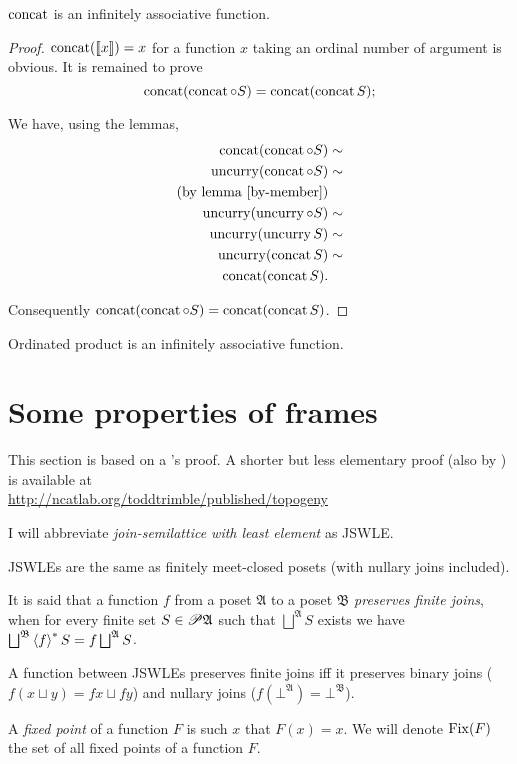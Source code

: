 \begin{thm}
$\operatorname{concat}$ is an infinitely associative function.\end{thm}
\begin{proof}
$\operatorname{concat}(\llbracket x\rrbracket)=x$ for a function $x$ taking an
ordinal number of argument is obvious. It is remained to prove
\[
\operatorname{concat}(\operatorname{concat}\circ S)=\operatorname{concat}(\operatorname{concat} S);
\]


We have, using the lemmas,
\begin{align*}
\operatorname{concat}(\operatorname{concat}\circ S) & \sim\\
\operatorname{uncurry}(\operatorname{concat}\circ S) & \sim\\
\text{(by lemma \ref{by-member})}\\
\operatorname{uncurry}(\operatorname{uncurry}\circ S) & \sim\\
\operatorname{uncurry}(\operatorname{uncurry} S) & \sim\\
\operatorname{uncurry}(\operatorname{concat} S) & \sim\\
\operatorname{concat}(\operatorname{concat} S).
\end{align*}


Consequently $\operatorname{concat}(\operatorname{concat}\circ S)=\operatorname{concat}(\operatorname{concat} S)$.\end{proof}
\begin{cor}
Ordinated product is an infinitely associative function.
\end{cor}

\section{Some properties of frames}\label{some-frames}

This section is based on a 's proof. A shorter
but less elementary proof (also by ) is available
at\\
\href{http://ncatlab.org/toddtrimble/published/topogeny}{http://ncatlab.org/toddtrimble/published/topogeny}

I will abbreviate \emph{join-semilattice with least element} as JSWLE.
\begin{obvious}
JSWLEs are the same as finitely meet-closed posets (with nullary joins
included).
\end{obvious}

\begin{defn}
It is said that a function $f$ from a poset $\mathfrak{A}$ to a
poset $\mathfrak{B}$ \emph{preserves finite joins}, when for every
finite set $S\in\mathscr{P}\mathfrak{A}$ such that $\bigsqcup^{\mathfrak{A}}S$
exists we have $\bigsqcup^{\mathfrak{B}}\left\langle f\right\rangle^{\ast}S=f\bigsqcup^{\mathfrak{A}}S$.\end{defn}
\begin{obvious}
A function between JSWLEs preserves finite joins iff it preserves
binary joins ($f(x\sqcup y)=fx\sqcup fy$) and nullary joins ($f(\bot^{\mathfrak{A}})=\bot^{\mathfrak{B}}$).\end{obvious}
\begin{defn}
A \emph{fixed point} of a function $F$ is such $x$ that $F(x)=x$.
We will denote $\operatorname{Fix}(F)$ the set of all fixed points of a function
$F$.
\end{defn}


